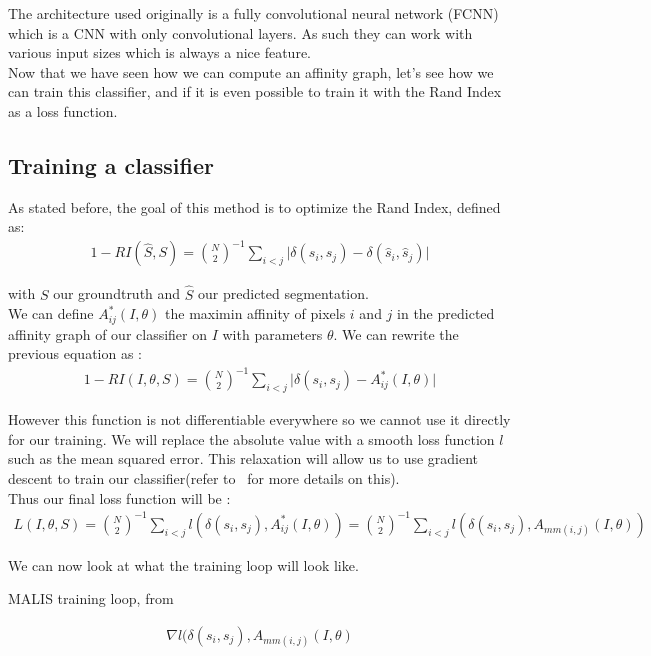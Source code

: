 The architecture used originally is a fully convolutional neural network
(FCNN) which is a CNN with only convolutional layers. As such they can work
with various input sizes which is always a nice feature.\\

Now that we have seen how we can compute an affinity graph, let's see how we
can train this classifier, and if it is even possible to train it with the Rand
Index as a loss function.

\subsection{Training a classifier}

As stated before, the goal of this method is to optimize the Rand Index,
defined as:
\begin{gather*}
	1 - RI(\hat{S},S) = \binom{N}{2}^{-1} \sum_{i<j} \lvert \delta(s_i,s_j) -
	\delta(\hat{s}_i,\hat{s}_j) \rvert
\end{gather*}

with $S$ our groundtruth and $\hat{S}$ our predicted segmentation.\\
We can define $A^*_{ij}(I,\theta)$ the maximin affinity of pixels $i$ and $j$
in the predicted affinity graph of our classifier on $I$ with parameters
$\theta$. We can rewrite the previous equation as :
\begin{gather*}
	1 - RI(I,\theta,S) = \binom{N}{2}^{-1} \sum_{i<j} \lvert \delta(s_i,s_j) -
	 A^*_{ij}(I,\theta)\rvert
\end{gather*}

However this function is not differentiable everywhere so we cannot use it
directly for our training. We will replace the absolute value with a smooth
loss function $l$ such as the mean squared error. This relaxation will allow us
to use gradient descent to train our classifier(refer to~\cite{turaga_maximin_2009}
for more details on this).\\

Thus our final loss function will be :
\begin{gather*}
	L(I,\theta,S) = \binom{N}{2}^{-1} \sum_{i<j} l(\delta(s_i,s_j),
	A^*_{ij}(I,\theta))
	= \binom{N}{2}^{-1} \sum_{i<j} l(\delta(s_i,s_j),A_{mm(i,j)}(I,\theta))
\end{gather*}

We can now look at what the training loop will look like.

\begin{algorithm}
\begin{algorithmic}[1]
\caption{MALIS training loop, from~\cite{turaga_maximin_2009}}\label{alg:malis}
	\Repeat
		\begin{gather*}
			\nabla l(\delta(s_i,s_j),A_{mm(i,j)}(I,\theta)
		\end{gather*}
\end{algorithmic}
\end{algorithm}

